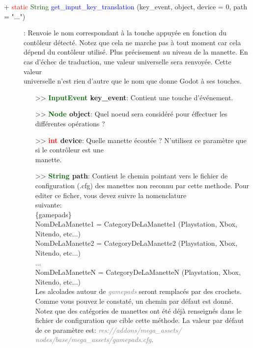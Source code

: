 \documentclass[a4paper, 11pt]{article}
\begin{document}
	\begin{description}
		\item [+ \textcolor{red}{static} \textcolor{darkgreen}{String} \textcolor{blue}
		{get\_input\_key\_translation} (key\_event, object, device = 0, path = "...")]: Renvoie le nom
		correspondant à la touche appuyée en fonction du contôleur détecté. Notez que cela ne marche pas à 
		tout moment car cela dépend du contôleur utilisé. Plus précisement au niveau de la manette. En cas 
		d'échec de traduction, une valeur universelle sera renvoyée. Cette valeur \\universelle n'est rien 
		d'autre que le nom que donne Godot à ses touches.
		\begin{itemize}
			\item[>> \textbf{\textcolor{darkgreen}{InputEvent} key\_event}:] Contient une touche 
			d'événement.
			\item [>> \textbf{\textcolor{darkgreen}{Node} object}:] Quel noeud sera considéré pour éffectuer
			les différentes opérations ?
			\item[>> \textbf{\textcolor{red}{int} device}:] Quelle manette écoutée ? N'utilisez ce paramètre 
			que si le contrôleur est une \\manette.
			\item[>> \textbf{\textcolor{darkgreen}{String} path}:] Contient le chemin pointant vers le 
			fichier de configuration (.cfg) des manettes non reconnu par cette methode. Pour editer ce
			ficher, vous devez suivre la nomenclature \\suivante:\\
			\{gamepads\}\\
			NomDeLaManette1 = CategoryDeLaManette1 (Playstation, Xbox, Nitendo, etc...)\\
			NomDeLaManette2 = CategoryDeLaManette2 (Playstation, Xbox, Nitendo, etc...)\\
			...\\
			NomDeLaManetteN = CategoryDeLaManetteN (Playstation, Xbox, Nitendo, etc...)\\
			Les alcolades autour de \textit{\textcolor{gray}{gamepads}} seront remplacés par des crochets.
			Comme vous pouvez le constaté, un chemin par défaut est donné. Notez que des catégories de
			manettes ont été déjà renseignés dans le fichier de configuration que cible cette méthode.
			La valeur par défaut de ce paramètre est: \textit{\textcolor{gray}{res://addons/mega\_assets/
			nodes/base/mega\_assets/gamepads.cfg}}.\\
		\end{itemize}
	\end{description}
\end{document}
